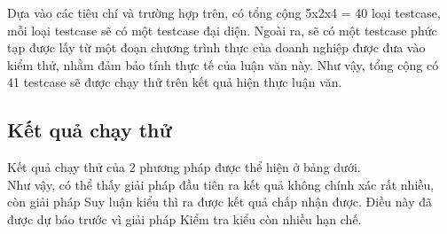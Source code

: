Dựa vào các tiêu chí và trường hợp trên, có tổng cộng 5x2x4 = 40 loại testcase, mỗi loại testcase sẽ có một testcase đại diện. Ngoài ra, sẽ có một testcase phức tạp được lấy từ một đoạn chương trình thực của doanh nghiệp được đưa vào kiểm thử, nhằm đảm bảo tính thực tế của luận văn này. Như vậy, tổng cộng có 41 testcase sẽ được chạy thử trên kết quả hiện thực luận văn.\\

\subsection{Kết quả chạy thử}

Kết quả chạy thử của 2 phương pháp được thể hiện ở bảng dưới.\\


Như vậy, có thể thấy giải pháp đầu tiên ra kết quả không chính xác rất nhiều, còn giải pháp Suy luận kiểu thì ra được kết quả chấp nhận được. Điều này đã được dự báo trước vì giải pháp Kiểm tra kiểu còn nhiều hạn chế.\\
